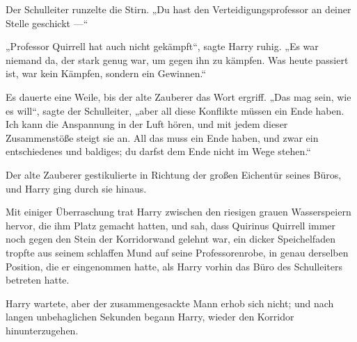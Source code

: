 Der Schulleiter runzelte die Stirn.
„Du hast den Verteidigungsprofessor an deiner Stelle geschickt —“

„Professor Quirrell hat auch nicht gekämpft“, sagte Harry ruhig.
„Es war niemand da, der stark genug war, um gegen ihn zu kämpfen. Was heute passiert ist, war kein Kämpfen, sondern ein Gewinnen.“

Es dauerte eine Weile, bis der alte Zauberer das Wort ergriff.
„Das mag sein, wie es will“, sagte der Schulleiter, „aber all diese Konflikte müssen ein Ende haben. Ich kann die Anspannung in der Luft hören, und mit jedem dieser Zusammenstöße steigt sie an. All das muss ein Ende haben, und zwar ein entschiedenes und baldiges; du darfst dem Ende nicht im Wege stehen.“

Der alte Zauberer gestikulierte in Richtung der großen Eichentür seines Büros, und Harry ging durch sie hinaus.

\later

Mit einiger Überraschung trat Harry zwischen den riesigen grauen Wasserspeiern hervor, die ihm Platz gemacht hatten, und sah, dass Quirinus Quirrell immer noch gegen den Stein der Korridorwand gelehnt war, ein dicker Speichelfaden tropfte aus seinem schlaffen Mund auf seine Professorenrobe, in genau derselben Position, die er eingenommen hatte, als Harry vorhin das Büro des Schulleiters betreten hatte.

Harry wartete, aber der zusammengesackte Mann erhob sich nicht; und nach langen unbehaglichen Sekunden begann Harry, wieder den Korridor hinunterzugehen.

